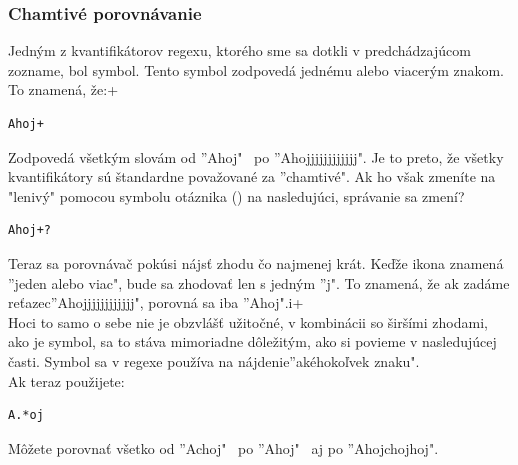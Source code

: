 \documentclass[10pt,twoside,slovak,a4paper]{article}
\begin{document}
\subsubsection{Chamtivé porovnávanie}
Jedným z kvantifikátorov regexu, ktorého sme sa dotkli v predchádzajúcom zozname, bol symbol. Tento symbol zodpovedá jednému alebo viacerým znakom. To znamená, že:+
\begin{lstlisting}[frame=single, basicstyle=\ttfamily\small, label=code:example]
	Ahoj+
	\end{lstlisting}
	Zodpovedá všetkým slovám od ''Ahoj" \ po ''Ahojjjjjjjjjjjj". Je to preto, že všetky kvantifikátory sú štandardne považované za ''chamtivé".
	Ak ho však zmeníte na "lenivý" pomocou symbolu otáznika () na nasledujúci, správanie sa zmení?
\begin{lstlisting}[frame=single, basicstyle=\ttfamily\small, label=code:example]
	Ahoj+?
	\end{lstlisting}
	Teraz sa porovnávač pokúsi nájsť zhodu čo najmenej krát. Keďže ikona znamená ''jeden alebo viac", bude sa zhodovať len s jedným ''j". To znamená, že ak zadáme reťazec''Ahojjjjjjjjjjjj", porovná sa iba ''Ahoj".i+\\
    Hoci to samo o sebe nie je obzvlášť užitočné, v kombinácii so širšími zhodami, ako je symbol, sa to stáva mimoriadne dôležitým, ako si povieme v nasledujúcej časti. Symbol sa v regexe používa na nájdenie''akéhokoľvek znaku".\\
	Ak teraz použijete:
\begin{lstlisting}[frame=single, basicstyle=\ttfamily\small, label=code:example]
	A.*oj
	\end{lstlisting}
	Môžete porovnať všetko od ''Achoj" \ po ''Ahoj" \ aj po ''Ahojchojhoj".
\end{document}
